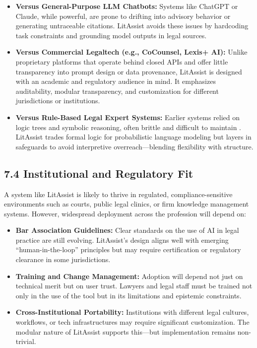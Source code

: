 \documentclass[12pt,a4paper]{article}
\begin{document}
\begin{itemize}
\item \textbf{Versus General-Purpose LLM Chatbots:} Systems like ChatGPT or Claude, while powerful, are prone to drifting into advisory behavior or generating untraceable citations. LitAssist avoids these issues by hardcoding task constraints and grounding model outputs in legal sources.

\item \textbf{Versus Commercial Legaltech (e.g., CoCounsel, Lexis+ AI):} Unlike proprietary platforms that operate behind closed APIs and offer little transparency into prompt design or data provenance, LitAssist is designed with an academic and regulatory audience in mind. It emphasizes auditability, modular transparency, and customization for different jurisdictions or institutions.

\item \textbf{Versus Rule-Based Legal Expert Systems:} Earlier systems relied on logic trees and symbolic reasoning, often brittle and difficult to maintain \cite{Ashley2017}. LitAssist trades formal logic for probabilistic language modeling but layers in safeguards to avoid interpretive overreach—blending flexibility with structure.
\end{itemize}

\subsection*{7.4 Institutional and Regulatory Fit}

A system like LitAssist is likely to thrive in regulated, compliance-sensitive environments such as courts, public legal clinics, or firm knowledge management systems. However, widespread deployment across the profession will depend on:

\begin{itemize}
\item \textbf{Bar Association Guidelines:} Clear standards on the use of AI in legal practice are still evolving. LitAssist's design aligns well with emerging ``human-in-the-loop'' principles but may require certification or regulatory clearance in some jurisdictions.

\item \textbf{Training and Change Management:} Adoption will depend not just on technical merit but on user trust. Lawyers and legal staff must be trained not only in the use of the tool but in its limitations and epistemic constraints.

\item \textbf{Cross-Institutional Portability:} Institutions with different legal cultures, workflows, or tech infrastructures may require significant customization. The modular nature of LitAssist supports this—but implementation remains non-trivial.
\end{itemize}
\end{document}
